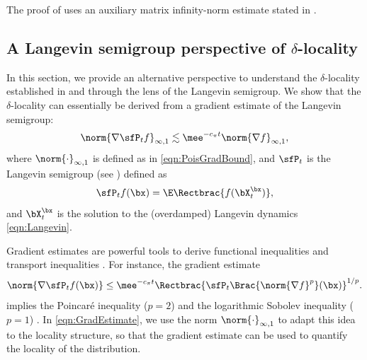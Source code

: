 \documentclass[11pt]{article}
\begin{document}
The proof of  uses an auxiliary matrix infinity-norm estimate stated in .

\subsection{A Langevin semigroup perspective of \texorpdfstring{$\delta$}{delta}-locality}
\label{sec:semigroup}

In this section, we provide an alternative perspective to understand the $\delta$-locality established in  and  through the lens of the Langevin semigroup.
%
We show that the $\delta$-locality can essentially be derived from a gradient estimate of the Langevin semigroup: 
\begin{equation}
\label{eqn:GradEstimate}
    \norm{ \nabla \sfP_t f }_{\infty,1} \lesssim \mee^{-c_\pi t} \norm{\nabla f}_{\infty,1}, 
\end{equation}
where $\norm{\cdot}_{\infty,1}$ is defined as in \eqref{eqn:PoisGradBound}, and $\sfP_t$ is the Langevin semigroup (see \cite{MR3155209}) defined as 
\begin{equation}
\label{eqn:Pt}
    \sfP_t f(\bx) = \E \Rectbrac{ f(\bX_t^\bx) },
\end{equation}
and $\bX_t^\bx$ is the solution to the (overdamped) Langevin dynamics \eqref{eqn:Langevin}.



Gradient estimates are powerful tools to derive functional inequalities and transport inequalities \cite{Guillin2009,KUWADA20103758,MR3155209}.
For instance, the gradient estimate
\begin{equation}
    \norm{ \nabla \sfP_t f (\bx) } \le \mee^{-c_\pi t}  \Rectbrac{ \sfP_t \Brac{ \norm{\nabla f}^p } (\bx) }^{1/p}.
\end{equation}
implies the Poincar\'e inequality ($p=2$) and the logarithmic Sobolev inequality ($p=1$) \cite{MR3155209}. 
In \eqref{eqn:GradEstimate}, we use the norm $\norm{\cdot}_{\infty,1}$ to adapt this idea to the locality structure, so that the gradient estimate can be used to quantify the locality of the distribution. 
\end{document}
